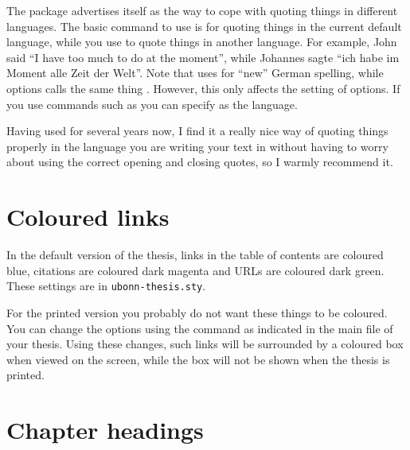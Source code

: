 The  package advertises itself as the way to cope
with quoting things in different languages. The basic
command to use is  for quoting things in the current default language, while you
use  to quote things in another language. For
example, John said \enquote{I have too much to do at the moment},
while \foreignlanguage{ngerman}{Johannes sagte}
\foreignquote{ngerman}{ich habe im Moment alle Zeit der Welt}. Note
that  uses  for \enquote{new} German
spelling, while  options calls the same thing
. However, this only affects the setting of options. If
you use commands such as  you can specify
 as the language.

Having used  for several years now, I find it a
really nice way of quoting things properly in the language you are
writing your text in without having to worry about using the correct
opening and closing quotes, so I warmly recommend it.


\section{Coloured links}
\label{sec:layout:link}

In the default version of the thesis, links in the table of contents
are coloured blue, citations are coloured dark magenta and URLs are
coloured dark green. These settings are in \texttt{ubonn-thesis.sty}.

For the printed version you probably do not want these things to be
coloured. You can change the  options using the
 command as indicated in the main file of your
thesis. Using these changes, such links will be surrounded by a
coloured box when viewed on the screen, while the box will not be shown when the thesis
is printed.


\section{Chapter headings}
\label{sec:layout:chapter}

